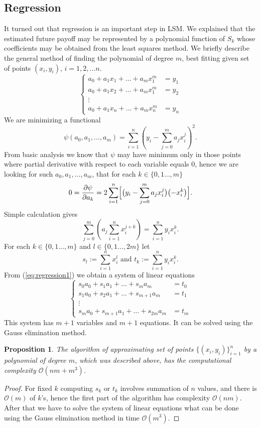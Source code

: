 \documentclass[a4paper,11pt, twoside]{book}
\newtheorem{prop}[thm]{Proposition}
\theoremstyle{definition}
\theoremstyle{remark}
\begin{document}
\subsection{Regression}
It turned out that regression is an important step in LSM. We explained that the estimated future payoff may be represented by a polynomial function of $S_k$ whose coefficients may be obtained from the least squares method. We briefly describe the general method of finding the polynomial of degree $m$, best fitting given set of points $(x_i, y_i)$, $i=1,2,...n$.
\[ \begin{cases}
    a_0 + a_1 x_1 + \ldots + a_m x_1^m &= y_1 \\
    a_0 + a_1 x_2 + \ldots + a_m x_1^m &= y_2 \\
    \vdots & \\
    a_0 + a_1 x_n + \ldots + a_m x_n^m &= y_n
   \end{cases}
\]
We are minimizing a functional
\[ \psi(a_0,a_1,\ldots,a_m) = \sum\limits_{i=1}^n \left( y_i - \sum\limits_{j=0}^m a_jx_i^j \right)^2. \]
From basic analysis we know that $\psi$ may have minimum only in those points where partial derivative with respect to each variable equals 0, hence we are looking for such $a_0,a_1,\ldots,a_m$, that for each $k \in \{0,1\ldots,m\}$
\[ 0 = \frac{\partial \psi}{\partial a_k} = 2  \sum\limits_{i=1}^n \Bigl[ \bigl( y_i - \sum\limits_{j=0}^m a_jx_i^j \bigr) \bigl( -x_i^k \bigr) \Bigl]. \]
Simple calculation gives
\begin{equation}
 \label{eq:regression1}
 \sum\limits_{j=0}^m \left( a_j \sum\limits_{i=1}^n  x_i^{j+k} \right) = \sum\limits_{i=1}^n y_i x_i^k. 
\end{equation}
For each $k \in \{0,1\ldots,m\}$ and $l \in \{0,1\ldots,2m\}$ let
\[ s_{l} := \sum\limits_{i=1}^n  x_i^l \text{\ \ \ and \ \ } t_k := \sum\limits_{i=1}^n y_i x_i^k .\]
From (\ref{eq:regression1}) we obtain a system of linear equations
\begin{equation}
 \label{eq:regression2}
 \begin{cases}
  s_0 a_0 + s_1 a_1 + \ldots + s_m a_m &= t_0 \\
  s_1 a_0 + s_2 a_1 + \ldots + s_{m+1} a_m &= t_1 \\
    \vdots & \\
  s_m a_0 + s_{m+1} a_1 + \ldots + s_{2m} a_m &= t_m
  \end{cases}
\end{equation}
This system has $m+1$ variables and $m+1$ equations. It can be solved using the Gauss elimination method.
\begin{prop}
 The algorithm of approximating set of points $\{ (x_i,y_i) \}_{i=1}^n$ by a polynomial of degree $m$, which was described above, has the computational complexity \mbox{$\mathcal{O}(nm + m^3)$}.
\end{prop}
\begin{proof}
 For fixed $k$ computing $s_k$ or $t_k$ involves summation of $n$ values, and there is $\mathcal{O}(m)$ of $k$'s, hence the first part of the algorithm  has complexity $\mathcal{O}(nm)$. After that we have to solve the system of linear equations what can be done using the Gauss elimination method in time $\mathcal{O}(m^3)$.
\end{proof}
\end{document}

